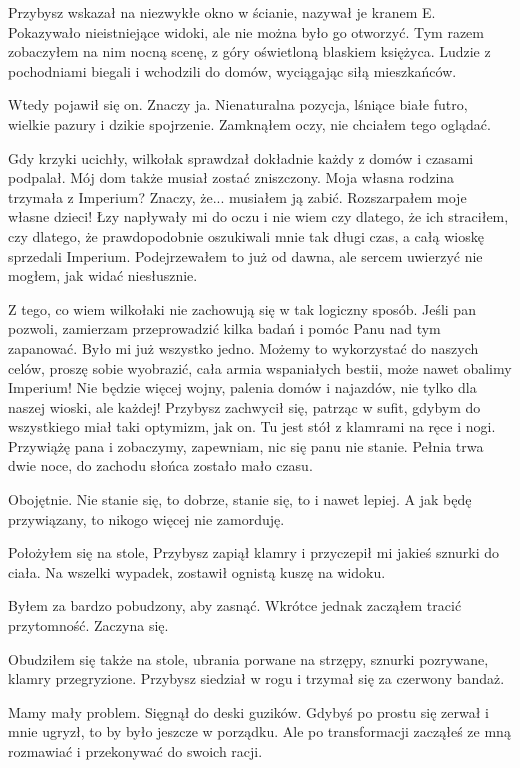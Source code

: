 Przybysz wskazał na niezwykłe okno w ścianie, nazywał je kranem E.
Pokazywało nieistniejące widoki, ale nie można było go otworzyć.
Tym razem zobaczyłem na nim nocną scenę, z góry oświetloną blaskiem księżyca. 
Ludzie z pochodniami biegali i wchodzili do domów, wyciągając siłą mieszkańców.

Wtedy pojawił się on. Znaczy ja.
Nienaturalna pozycja, lśniące białe futro, wielkie pazury i dzikie spojrzenie.
Zamknąłem oczy, nie chciałem tego oglądać.

Gdy krzyki ucichły, wilkołak sprawdzał dokładnie każdy z domów i czasami podpalał.
Mój dom także musiał zostać zniszczony. Moja własna rodzina trzymała z Imperium? 
Znaczy, że... musiałem ją zabić. Rozszarpałem moje własne dzieci!
Łzy napływały mi do oczu i nie wiem czy dlatego, że ich straciłem, czy dlatego, że prawdopodobnie oszukiwali mnie tak długi czas, a całą wioskę sprzedali Imperium.
Podejrzewałem to już od dawna, ale sercem uwierzyć nie mogłem, jak widać niesłusznie.

\ds{} Z tego, co wiem wilkołaki nie zachowują się w tak logiczny sposób.
Jeśli pan pozwoli, zamierzam przeprowadzić kilka badań i pomóc Panu nad tym zapanować.
\dm{} Było mi już wszystko jedno.
\dm{} Możemy to wykorzystać do naszych celów, proszę sobie wyobrazić, cała armia wspaniałych bestii, może nawet obalimy Imperium!
Nie będzie więcej wojny, palenia domów i najazdów, nie tylko dla naszej wioski, ale każdej! \dm{} Przybysz zachwycił się, patrząc w sufit, gdybym do wszystkiego miał taki optymizm, jak on.
\dm{} Tu jest stół z klamrami na ręce i nogi.
Przywiążę pana i zobaczymy, zapewniam, nic się panu nie stanie.
Pełnia trwa dwie noce, do zachodu słońca zostało mało czasu. \de{}

Obojętnie.
Nie stanie się, to dobrze, stanie się, to i nawet lepiej.
A jak będę przywiązany, to nikogo więcej nie zamorduję.

Położyłem się na stole, Przybysz zapiął klamry i przyczepił mi jakieś sznurki do ciała.
Na wszelki wypadek, zostawił ognistą kuszę na widoku.

Byłem za bardzo pobudzony, aby zasnąć. Wkrótce jednak zacząłem tracić przytomność. Zaczyna się.

\divider{}
Obudziłem się także na stole, ubrania porwane na strzępy, sznurki pozrywane, klamry przegryzione.
Przybysz siedział w rogu i trzymał się za czerwony bandaż.

\ds{} Mamy mały problem.
\dm{} Sięgnął do deski guzików.
\dm{} Gdybyś po prostu się zerwał i mnie ugryzł, to by było jeszcze w porządku.
Ale po transformacji zacząłeś ze mną rozmawiać i przekonywać do swoich racji. \de{}

